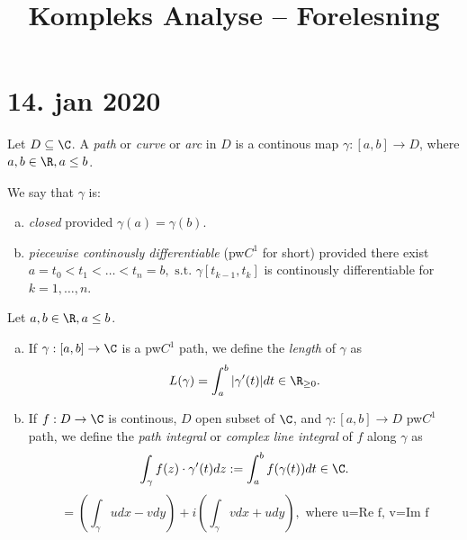 \title{Kompleks Analyse -- Forelesning}
\maketitle
\section{14. jan 2020}
\begin{definition}
   Let $D\subseteq \C$. A \emph{path} or \emph{curve} or \emph{arc} in $D$ is a continous map $\gamma: [a,b]\to D$, where $a,b \in \R, a\leq b$.
\end{definition}
\begin{remark}
  We say that $\gamma$ is:
    \begin{enumerate}[(a)]
      \item \emph{closed} provided $\gamma(a)=\gamma(b)$.
      \item \emph{piecewise continously differentiable} (pw$C^1$ for short) provided there exist
        $a=t_0<t_1 < \dots < t_n=b, \text{ s.t. } \gamma[t_{k-1},t_k]$ is continously differentiable for $k=1,\dots,n$.
    \end{enumerate}
\end{remark}

\begin{definition}
  Let $a,b\in \R, a\leq b$.
    \begin{enumerate}[(a)]
      \item If $\gamma:[a,b]\to \C$ is a pw$C^1$ path, we define the \emph{length} of $\gamma$ as
        $$L(\gamma)=\int_a^b|\gamma '(t)|dt \in \R_{\geq 0}.$$
      \item If $f:D\to \C$ is continous, $D$ open subset of $\C$, and $\gamma:[a,b]\to D$ pw$C^1$ path, we define the \emph{path integral} or \emph{complex line integral} of $f$ along $\gamma$ as
        $$\int_\gamma f(z)\cdot \gamma'(t)dz:=\int_a^bf(\gamma(t))dt \in \C.$$
        $$= \left( \int_\gamma udx-vdy \right)+i\left(\int_\gamma vdx+udy\right), \text{ where u=Re f, v=Im f}$$
    \end{enumerate}
\end{definition}

